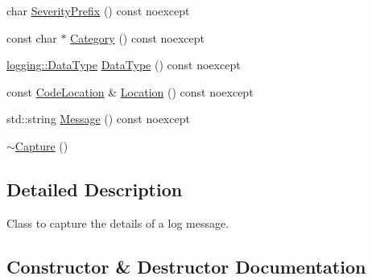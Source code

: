 \begin{DoxyCompactItemize}
\item 
char \mbox{\hyperlink{classonnxruntime_1_1logging_1_1Capture_ad13001a74ade433dc8f529b4f898e097}{Severity\+Prefix}} () const noexcept
\item 
const char $\ast$ \mbox{\hyperlink{classonnxruntime_1_1logging_1_1Capture_adb3d6734a64050e6662760db493662ad}{Category}} () const noexcept
\item 
\mbox{\hyperlink{namespaceonnxruntime_1_1logging_a7342198e47b8ad2717a5d6e28cf68951}{logging\+::\+Data\+Type}} \mbox{\hyperlink{classonnxruntime_1_1logging_1_1Capture_a901ba03e1dd6ea6b0346bcc7e0698617}{Data\+Type}} () const noexcept
\item 
const \mbox{\hyperlink{structonnxruntime_1_1CodeLocation}{Code\+Location}} \& \mbox{\hyperlink{classonnxruntime_1_1logging_1_1Capture_a970cedfcf2f57bffaa01064947bce978}{Location}} () const noexcept
\item 
std\+::string \mbox{\hyperlink{classonnxruntime_1_1logging_1_1Capture_a4aee00c9959c0f4d7e2b6dcd13fe1334}{Message}} () const noexcept
\item 
\mbox{\hyperlink{classonnxruntime_1_1logging_1_1Capture_a83b4d77f2027b237bad0452046bf96c4}{$\sim$\+Capture}} ()
\end{DoxyCompactItemize}


\subsection{Detailed Description}
Class to capture the details of a log message. 

\subsection{Constructor \& Destructor Documentation}
\mbox{\label{classonnxruntime_1_1logging_1_1Capture_a753b3eeee666d0303d81e0bcae11bc05}} 
